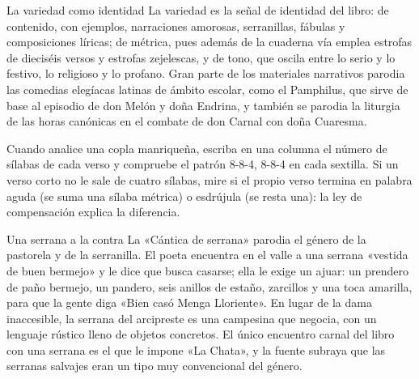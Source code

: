 \documentclass{book}
\begin{document}

\begin{tcolorbox}[title={Consejo}, studiumtip, breakable]

La variedad como identidad
La variedad es la señal de identidad del libro: de contenido, con ejemplos, narraciones amorosas, serranillas, fábulas y composiciones líricas; de métrica, pues además de la cuaderna vía emplea estrofas de dieciséis versos y estrofas zejelescas, y de tono, que oscila entre lo serio y lo festivo, lo religioso y lo profano. Gran parte de los materiales narrativos parodia las comedias elegíacas latinas de ámbito escolar, como el Pamphilus, que sirve de base al episodio de don Melón y doña Endrina, y también se parodia la liturgia de las horas canónicas en el combate de don Carnal con doña Cuaresma.


Cuando analice una copla manriqueña, escriba en una columna el número de sílabas de cada verso y compruebe el patrón 8-8-4, 8-8-4 en cada sextilla. Si un verso corto no le sale de cuatro sílabas, mire si el propio verso termina en palabra aguda (se suma una sílaba métrica) o esdrújula (se resta una): la ley de compensación explica la diferencia.

\end{tcolorbox}

\begin{tcolorbox}[title={Definición}, studiumdef, breakable]

Una serrana a la contra
La «Cántica de serrana» parodia el género de la pastorela y de la serranilla. El poeta encuentra en el valle a una serrana «vestida de buen bermejo» y le dice que busca casarse; ella le exige un ajuar: un prendero de paño bermejo, un pandero, seis anillos de estaño, zarcillos y una toca amarilla, para que la gente diga «Bien casó Menga Lloriente». En lugar de la dama inaccesible, la serrana del arcipreste es una campesina que negocia, con un lenguaje rústico lleno de objetos concretos. El único encuentro carnal del libro con una serrana es el que le impone «La Chata», y la fuente subraya que las serranas salvajes eran un tipo muy convencional del género.

\end{tcolorbox}
\end{document}
